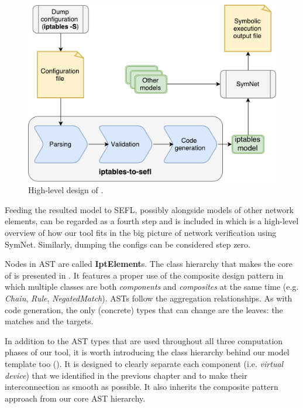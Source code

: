\begin{figure}[h]
  \centering
  \captionsetup{justification=centering}
  \includegraphics[scale=0.5]{assets/img/high-level-design}
  \caption{High-level design of \TOOL.}
  \label{fig:high-level-design}
\end{figure}

Feeding the resulted model to SEFL, possibly alongside models of other network
elements, can be regarded as a fourth step and is included in
 which is a high-level overview of
how our tool fits in the big picture of network verification using SymNet.
Similarly, dumping the configs can be considered step zero.

Nodes in AST are called \textbf{IptElement}s.  The class hierarchy that makes
the core of \TOOL is presented in .
It features a proper use of the composite design pattern in which multiple
classes are both \emph{components} and \emph{composites} at the same time (e.g.
\emph{Chain}, \emph{Rule}, \emph{NegatedMatch}).  ASTs follow the aggregation
relationships.  As with code generation, the only (concrete) types that can
change are the leaves: the matches and the targets.

In addition to the AST types that are used throughout all three computation
phases of our tool, it is worth introducing the class hierarchy behind our
model template too ().  It is
designed to clearly separate each component (i.e.  \emph{virtual device}) that
we identified in the previous chapter and to make their interconnection as
smooth as possible. It also inherits the composite pattern approach from our
core AST hierarchy.

